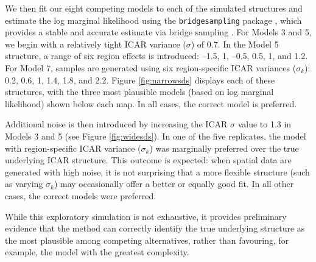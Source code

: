 \documentclass[webpdf,large,contemporary,namedate]{oup-authoring-template}
\theoremstyle{thmstyleone}
\theoremstyle{thmstyletwo}
\theoremstyle{thmstylethree}
\begin{document}
We then fit our eight competing models to each of the simulated
structures and estimate the log marginal likelihood using the
\texttt{bridgesampling} package \citep{Gronau2017}, which provides a
stable and accurate estimate via bridge sampling
\citep{meng1996simulating}. For Models 3 and 5, we begin with a
relatively tight ICAR variance (\(\sigma\)) of 0.7. In the Model 5
structure, a range of six region effects is introduced: --1.5, 1, --0.5,
0.5, 1, and 1.2. For Model 7, samples are generated using six
region-specific ICAR variances (\(\sigma_k\)): 0.2, 0.6, 1, 1.4, 1.8,
and 2.2. Figure \ref{fig:narrowsds} displays each of these structures,
with the three most plausible models (based on log marginal likelihood)
shown below each map. In all cases, the correct model is preferred.

Additional noise is then introduced by increasing the ICAR \(\sigma\)
value to 1.3 in Models 3 and 5 (see Figure \ref{fig:widesds}). In one of
the five replicates, the model with region-specific ICAR variance
(\(\sigma_k\)) was marginally preferred over the true underlying ICAR
structure. This outcome is expected: when spatial data are generated
with high noise, it is not surprising that a more flexible structure
(such as varying \(\sigma_k\)) may occasionally offer a better or
equally good fit. In all other cases, the correct models were preferred.

While this exploratory simulation is not exhaustive, it provides
preliminary evidence that the method can correctly identify the true
underlying structure as the most plausible among competing alternatives,
rather than favouring, for example, the model with the greatest
complexity.
\end{document}
